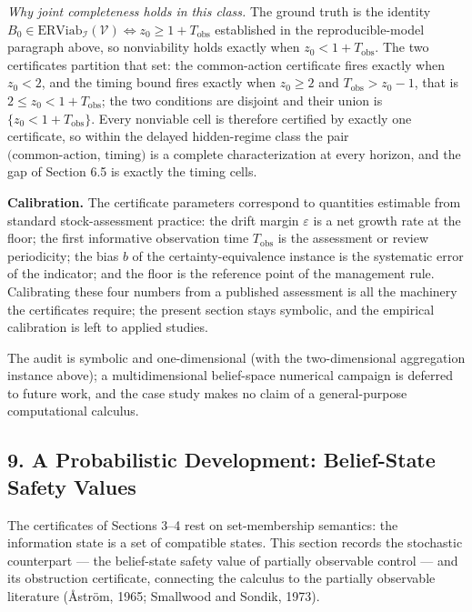 \documentclass[10pt,twocolumn]{article}
\theoremstyle{definition}
\begin{document}
\emph{Why joint completeness holds in this class.} The ground truth is the identity \(B_{0} \in \mathrm{ERViab}_{\mathcal{I}}(\mathcal{V}) \iff z_{0} \ge 1 + T_{\mathrm{obs}}\) established in the reproducible-model paragraph above, so nonviability holds exactly when \(z_{0} < 1 + T_{\mathrm{obs}}\). The two certificates partition that set: the common-action certificate fires exactly when \(z_{0} < 2\), and the timing bound fires exactly when \(z_{0} \ge 2\) and \(T_{\mathrm{obs}} > z_{0} - 1\), that is \(2 \le z_{0} < 1 + T_{\mathrm{obs}}\); the two conditions are disjoint and their union is \(\{z_{0} < 1 + T_{\mathrm{obs}}\}\). Every nonviable cell is therefore certified by exactly one certificate, so within the delayed hidden-regime class the pair \(\text{(common-action, timing)}\) is a complete characterization at every horizon, and the gap of Section 6.5 is exactly the timing cells.

\textbf{Calibration.} The certificate parameters correspond to quantities estimable from standard stock-assessment practice: the drift margin \(\varepsilon\) is a net growth rate at the floor; the first informative observation time \(T_{\mathrm{obs}}\) is the assessment or review periodicity; the bias \(b\) of the certainty-equivalence instance is the systematic error of the indicator; and the floor is the reference point of the management rule. Calibrating these four numbers from a published assessment is all the machinery the certificates require; the present section stays symbolic, and the empirical calibration is left to applied studies.

The audit is symbolic and one-dimensional (with the two-dimensional aggregation instance above); a multidimensional belief-space
numerical campaign is deferred to future work, and the case study makes
no claim of a general-purpose computational calculus.

\subsection{9. A Probabilistic Development: Belief-State Safety Values}\label{probabilistic-development}

The certificates of Sections 3--4 rest on set-membership semantics: the information state is a set of compatible states. This section records the stochastic counterpart --- the belief-state safety value of partially observable control --- and its obstruction certificate, connecting the calculus to the partially observable literature (\r{A}str\"om, 1965; Smallwood and Sondik, 1973).
\end{document}
